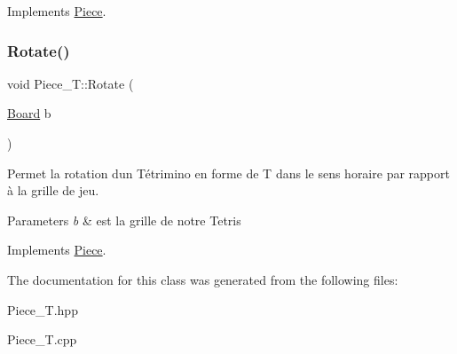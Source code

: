 Implements \hyperlink{classPiece_a56cdf7f4234fe848a3e203b693b7a862}{Piece}.

\mbox{\label{classPiece__T_affedcbe550aebd2a9e8ec169d1fe0a9f}} 
\subsubsection{\texorpdfstring{Rotate()}{Rotate()}}
{\footnotesize\ttfamily void Piece\+\_\+\+T\+::\+Rotate (\begin{DoxyParamCaption}\item[{\hyperlink{classBoard}{Board}}]{b }\end{DoxyParamCaption})\hspace{0.3cm}{\ttfamily [virtual]}}



Permet la rotation d\textquotesingle{}un Tétrimino en forme de T dans le sens horaire par rapport à la grille de jeu. 


\begin{DoxyParams}{Parameters}
{\em b} & est la grille de notre Tetris \\
\hline
\end{DoxyParams}


Implements \hyperlink{classPiece_a078f3cc6281cb8f60af3ae2266c651ba}{Piece}.



The documentation for this class was generated from the following files\+:\begin{DoxyCompactItemize}
\item 
Piece\+\_\+\+T.\+hpp\item 
Piece\+\_\+\+T.\+cpp\end{DoxyCompactItemize}
